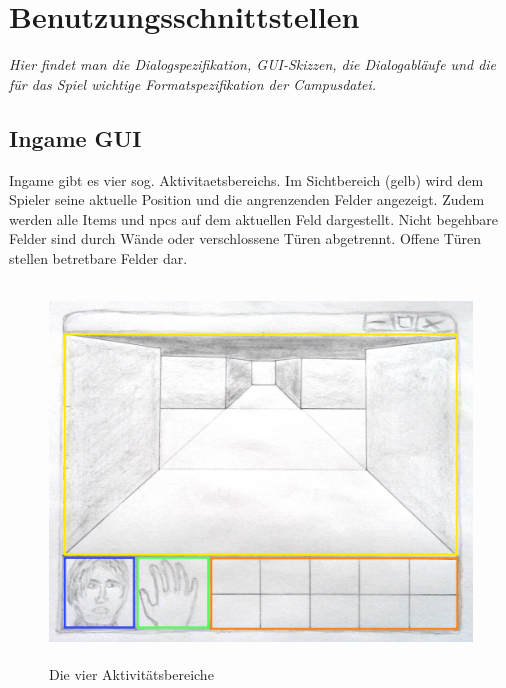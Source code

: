 \pagebreak[4]
\chapter{Benutzungsschnittstellen}

\textit{Hier findet man die Dialogspezifikation, GUI-Skizzen, die Dialogabläufe und die für das Spiel wichtige
Formatspezifikation der Campusdatei.}

\section{Ingame GUI}
Ingame gibt es vier sog. \glspl{Aktivitaetsbereich}. Im \gls{Sichtbereich} (gelb) wird dem \gls{Spieler} seine 
aktuelle Position und die angrenzenden Felder angezeigt. Zudem werden alle 
\glspl{Item} und \gls{npcs} auf dem aktuellen Feld dargestellt. Nicht begehbare Felder sind durch Wände oder
verschlossene Türen abgetrennt. Offene Türen stellen betretbare Felder dar.
\\
\begin{figure}[h]
	\begin{center}
		\includegraphics[width=13cm, height=10cm]{kapitel/ui/ig_kreuz_small_color.jpg}
	\end{center}
	\caption{Die vier Aktivitätsbereiche}
	\label{fig:ig_kreuz_color}
\end{figure}

